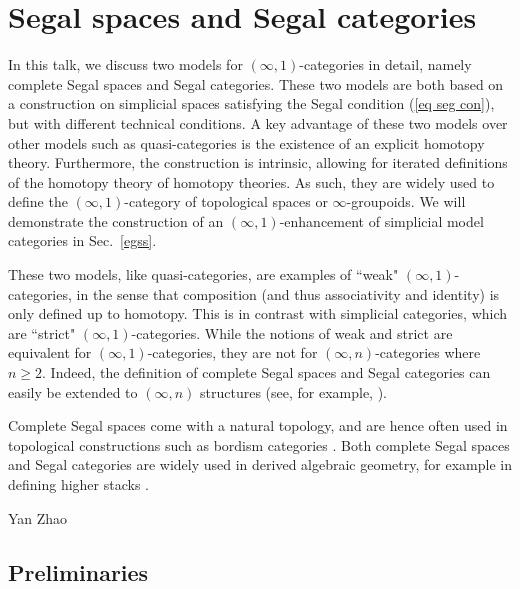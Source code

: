 \chapter{Segal spaces and Segal categories}


\begin{refsection}


In this talk, we discuss two models for $(\infty,1)$-categories in detail, namely complete Segal spaces and Segal categories. These two models are both based on a construction on simplicial spaces satisfying the Segal condition (\ref{eq seg con}), but with different technical conditions. A key advantage of these two models over other models such as quasi-categories is the existence of an explicit homotopy theory. Furthermore, the construction is intrinsic, allowing for iterated definitions of the homotopy theory of homotopy theories. As such, they are widely used to define the $(\infty,1)$-category of topological spaces or $\infty$-groupoids. We will demonstrate the construction of an $(\infty,1)$-enhancement of simplicial model categories in Sec.~\ref{egss}.

These two models, like quasi-categories, are examples of ``weak" $(\infty,1)$-categories, in the sense that composition (and thus associativity and identity) is only defined up to homotopy. This is in contrast with simplicial categories, which are ``strict" $(\infty,1)$-categories. While the notions of weak and strict are equivalent for $(\infty,1)$-categories, they are not for $(\infty,n)$-categories where $n\ge2$. Indeed, the definition of complete Segal spaces and Segal categories can easily be extended to $(\infty,n)$ structures (see, for example, \cite{bergner-rezk-comparison-models-oo-n-categories-I,hirschowitz-simpson-descente-pour-les-n-champs,lurie-classification-topological-field-theories}).

Complete Segal spaces come with a natural topology, and are hence often used in topological constructions such as bordism categories \cite{lurie-classification-topological-field-theories}. Both complete Segal spaces and Segal categories are widely used in derived algebraic geometry, for example in defining higher stacks \cite{hirschowitz-simpson-descente-pour-les-n-champs}.

\begin{flushright}
Yan Zhao
\end{flushright}

\section{Preliminaries}

\end{refsection}
